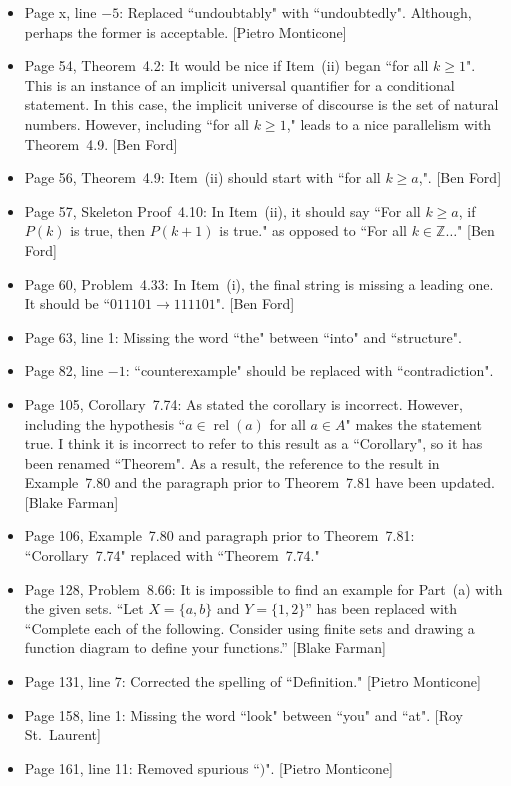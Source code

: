 \documentclass[11pt]{article}%
\DeclareMathOperator{\rel}{rel}
\begin{document}
\begin{itemize}
\item Page x, line $-5$: Replaced ``undoubtably" with ``undoubtedly". Although, perhaps the former is acceptable. [Pietro Monticone]
\item Page 54, Theorem~4.2: It would be nice if Item~(ii) began ``for all $k\geq 1$".  This is an instance of an implicit universal quantifier for a conditional statement.  In this case, the implicit universe of discourse is the set of natural numbers.  However, including ``for all $k\geq 1$," leads to a nice parallelism with Theorem~4.9. [Ben Ford]
\item Page 56, Theorem~4.9: Item~(ii) should start with ``for all $k\geq a$,". [Ben Ford]
\item Page 57, Skeleton Proof~4.10: In Item~(ii), it should say ``For all $k\geq a$, if $P(k)$ is true, then $P(k+1)$ is true." as opposed to ``For all $k\in\mathbb{Z}\ldots$" [Ben Ford]
\item Page 60, Problem~4.33: In Item~(i), the final string is missing a leading one.  It should be ``$011101 \to 111101$". [Ben Ford]
\item Page 63, line 1: Missing the word ``the" between ``into" and ``structure". 
\item Page 82, line $-1$: ``counterexample" should be replaced with ``contradiction". 
\item Page 105, Corollary~7.74: As stated the corollary is incorrect. However, including the hypothesis ``$a\in\rel(a)$ for all $a\in A$" makes the statement true. I think it is incorrect to refer to this result as a ``Corollary", so it has been renamed ``Theorem". As a result, the reference to the result in Example~7.80 and the paragraph prior to Theorem~7.81 have been updated. [Blake Farman]
\item Page 106, Example~7.80 and paragraph prior to Theorem~7.81: ``Corollary~7.74" replaced with ``Theorem~7.74."
\item Page 128, Problem~8.66: It is impossible to find an example for Part~(a) with the given sets.  ``Let $X=\{a,b\}$ and $Y=\{1,2\}$'' has been replaced with ``Complete each of the following. Consider using finite sets and drawing a function diagram to define your functions.'' [Blake Farman]
\item Page 131, line 7: Corrected the spelling of ``Definition." [Pietro Monticone]
\item Page 158, line 1: Missing the word ``look" between ``you" and ``at". [Roy St.~Laurent]
\item Page 161, line 11: Removed spurious ``$)$". [Pietro Monticone]
\end{itemize}
\end{document}
